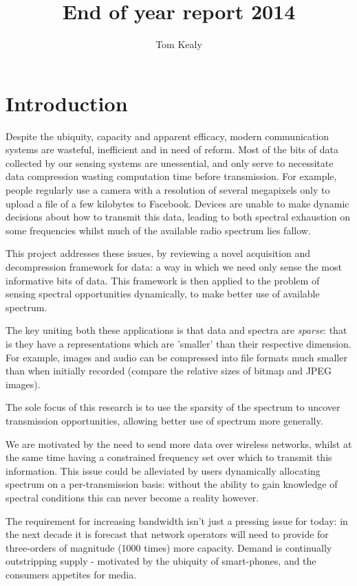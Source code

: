 \documentclass[conference]{IEEEtran}
\begin{document}
\title{End of year report 2014}
\author{Tom Kealy}



\maketitle

\section{Introduction}
Despite the ubiquity, capacity and apparent efficacy, modern communication systems are wasteful, inefficient and in need of reform. Most of the bits of data collected by our sensing systems are unessential, and only serve to necessitate data compression wasting computation time before transmission. For example, people regularly use a camera with a resolution of several megapixels only to upload a file of a few kilobytes to Facebook. Devices are unable to make dynamic decisions about how to transmit this data, leading to both spectral exhaustion on some frequencies whilst much of the available radio spectrum lies fallow. 

This project addresses these issues, by reviewing a novel acquisition and decompression framework for data: a way in which we need only sense the most informative bits of data. This framework is then applied to the problem of sensing spectral opportunities dynamically, to make better use of available spectrum. 

The key uniting both these applications is that data and spectra are \textit{sparse}: that is they have a representations which are 'smaller' than their respective dimension. For example, images and audio can be compressed into file formats much smaller than when initially recorded (compare the relative sizes of bitmap and JPEG images).

The sole focus of this research is to use the sparsity of the spectrum to uncover transmission opportunities, allowing better use of spectrum more generally. 

We are motivated by the need to send more data over wireless networks, whilst at the same time having a constrained frequency set over which to transmit this information. This issue could be alleviated by users dynamically allocating spectrum on a per-transmission basis: without the ability to gain knowledge of spectral conditions this can never become a reality however. 

The requirement for increasing bandwidth isn't just a pressing issue for today: in the next decade it is forecast that network operators will need to provide for three-orders of magnitude (1000 times) more capacity. Demand is continually outstripping supply - motivated by the ubiquity of smart-phones, and the consumers appetites for media. 
\end{document}
